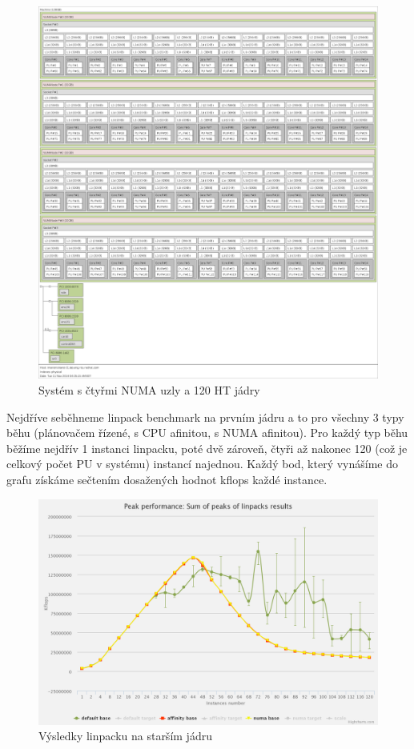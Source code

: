 \documentclass[a4paper,12pt]{article}
\begin{document}
\begin{figure}[ht]
\includegraphics[scale=0.2]{obrazky/lsTOPO-brickland.png}
\caption{Systém s čtyřmi NUMA uzly a 120 HT jádry}
\label{4 NUMA NODE system scheme}
\end{figure}

Nejdříve seběhneme linpack benchmark na prvním jádru a to pro všechny 3 typy běhu (plánovačem řízené, s CPU afinitou, s NUMA afinitou). Pro každý typ běhu běžíme nejdřív 1 instanci linpacku, poté dvě zároveň, čtyři až nakonec 120 (což je celkový počet PU v systému) instancí najednou. Každý bod, který vynášíme do grafu získáme sečtením dosažených hodnot kflops každé instance.

\begin{figure}[ht]
\includegraphics[scale=0.2]{obrazky/LinpackBaseChart.png}
\caption{Výsledky linpacku na starším jádru}
\label{older kernel linpack results}
\end{figure}
\end{document}
